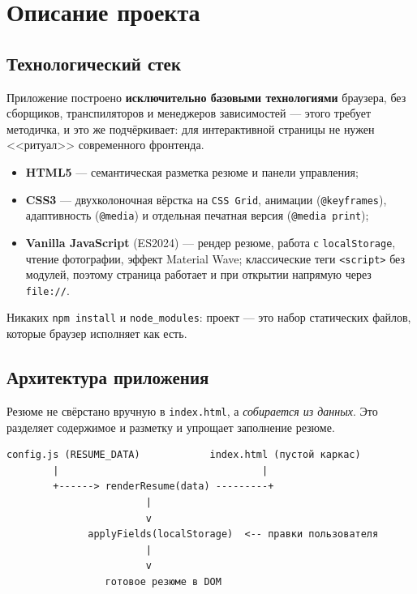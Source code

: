 \chapter{Описание проекта}
\label{ch:project}

\section{Технологический стек}

Приложение построено \textbf{исключительно базовыми технологиями} браузера,
без сборщиков, транспиляторов и менеджеров зависимостей --- этого требует
методичка, и это же подчёркивает: для интерактивной страницы не нужен
<<ритуал>> современного фронтенда.

\begin{itemize}
  \item \textbf{HTML5} --- семантическая разметка резюме и панели управления;
  \item \textbf{CSS3} --- двухколоночная вёрстка на \texttt{CSS~Grid},
        анимации (\texttt{@keyframes}), адаптивность (\texttt{@media}) и
        отдельная печатная версия (\texttt{@media~print});
  \item \textbf{Vanilla JavaScript} (ES2024) --- рендер резюме, работа с
        \texttt{localStorage}, чтение фотографии, эффект Material Wave;
        классические теги \texttt{<script>} без модулей, поэтому страница
        работает и при открытии напрямую через \texttt{file://}.
\end{itemize}

Никаких \texttt{npm~install} и \texttt{node\_modules}: проект --- это набор
статических файлов, которые браузер исполняет как есть.

\section{Архитектура приложения}

Резюме не свёрстано вручную в \texttt{index.html}, а \textit{собирается из
данных}. Это разделяет содержимое и разметку и упрощает заполнение резюме.

\begin{lstlisting}[caption={Поток данных при загрузке страницы},captionpos=b]
config.js (RESUME_DATA)            index.html (пустой каркас)
        |                                   |
        +------> renderResume(data) ---------+
                        |
                        v
              applyFields(localStorage)  <-- правки пользователя
                        |
                        v
                 готовое резюме в DOM
\end{lstlisting}

